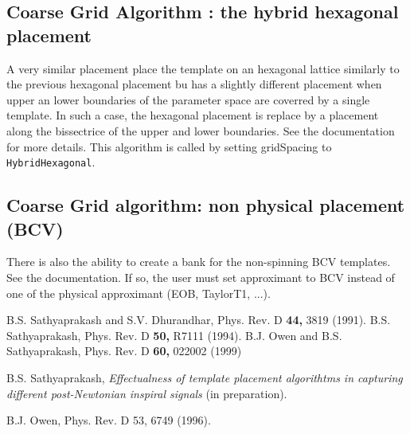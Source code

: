 \subsection{Coarse Grid Algorithm : the hybrid hexagonal placement}
A very similar placement place the template on an hexagonal lattice similarly
to the previous hexagonal placement bu has a slightly different placement when
upper an lower boundaries of the parameter space are coverred by a single
template. In such a case, the hexagonal placement is replace by a placement
along the bissectrice of the upper and lower boundaries. See the documentation
for more details. This algorithm is called by setting gridSpacing to  \texttt{HybridHexagonal}.

\subsection{Coarse Grid algorithm: non physical placement (BCV)}
There is also the ability to create a bank for the non-spinning BCV templates.
See the documentation. If so, the user must set approximant to BCV instead of
one of the physical approximant (EOB, TaylorT1, ...).

\newpage

\begin{thebibliography}{}
 B.S. Sathyaprakash and
S.V. Dhurandhar, Phys. Rev. D {\bf 44,} 3819 (1991).
 B.S. Sathyaprakash, Phys. Rev. D {\bf 50,} R7111
(1994).
 B.J. Owen and B.S. Sathyaprakash,
Phys. Rev. D {\bf 60,} 022002 (1999)

 B.S. Sathyaprakash, {\it Effectualness of
template placement algorithtms in capturing different post-Newtonian
inspiral signals} (in preparation).

 B.J. Owen, Phys. Rev. D 53, 6749 (1996).
\end{thebibliography}
